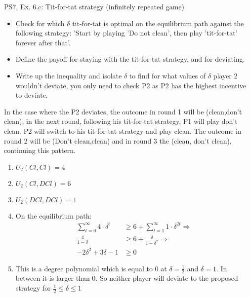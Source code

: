 \begin{frame}{PS7, Ex. 6.c: Tit-for-tat strategy (infinitely repeated game)}
    \begin{itemize}
    \item[(c)] Check for which $\delta$ tit-for-tat is optimal on the equilibrium path against the following strategy: ’Start by playing ’Do not clean’, then play ’tit-for-tat’ forever after that’.
    \end{itemize}
  \begin{multicols}{2}
  \begin{itemize}
      \item[(Step a)] Define the payoff for staying with the tit-for-tat strategy, and for deviating.
      \item[(Step b)] Write up the inequality and isolate $\delta$ to find for what values of $\delta$ player 2 wouldn't deviate, you only need to check P2 as P2 has the highest incentive to deviate.
  \end{itemize}
  In the case where the P2 deviates, the outcome in round 1 will be (clean,don't clean), in the next round, following his tit-for-tat strategy, P1 will play don't clean. P2 will switch to his tit-for-tat strategy and play clean. The outcome in round 2 will be (Don't clean,clean) and in round 3 the (clean, don't clean), continuing this pattern.
    \vfill\null\columnbreak
    \begin{enumerate}
        \item $U_2(Cl,Cl) = 4$
        \item $U_2(Cl,DCl) = 6$
        \item $U_2(DCl,DCl) = 1$
        \item On the equilibrium path:
        \begin{align*}
            \sum_{t=0}^{\infty} 4\cdot\delta^{t}&\geq 6 + \sum_{t=1}^{\infty} 1\cdot\delta^{2t}\Rightarrow\\
            \frac{4}{1-\delta} &\geq 6 + \frac{\delta}{1-\delta^2}\Rightarrow\\
            -2\delta^2 + 3\delta - 1 &\geq 0
        \end{align*}
        \item This is a  degree polynomial which is equal to 0 at $\delta=\frac{1}{2}$ and $\delta=1$. In between it is larger than 0. So neither player will deviate to the proposed strategy for $\frac{1}{2}\leq\delta\leq1$
    \end{enumerate}
    \vfill\null
  \end{multicols}
\end{frame}

